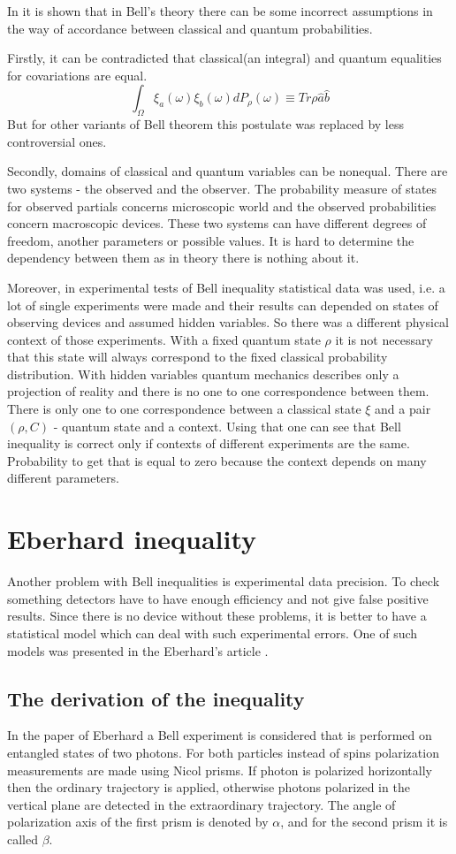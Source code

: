 \documentclass[11pt]{article}
\begin{document}
In \cite{Khrennikov_information} it is shown that in Bell's theory there can be some incorrect assumptions in the way of accordance between classical and quantum probabilities.

Firstly, it can be contradicted that classical(an integral) and quantum equalities for covariations are equal.
$$\int_\Omega\xi_a(\omega)\xi_b(\omega)dP_\rho(\omega) \equiv Tr\rho\hat{a}\hat{b}$$
But for other variants of Bell theorem this postulate was replaced by less controversial ones.

Secondly, domains of classical and quantum variables can be nonequal. There are two systems - the observed and the observer. The probability measure of states for observed partials concerns microscopic world and the observed probabilities concern macroscopic devices. These two systems can have different degrees of freedom, another parameters or possible values. It is hard to determine the dependency between them as in theory there is nothing about it.

Moreover, in experimental tests of Bell inequality statistical data was used, i.e. a lot of single experiments were made and their results can depended on states of observing devices and assumed hidden variables. So there was a different physical context of those experiments. With a fixed quantum state $\rho$ it is not necessary that this state will always correspond to the fixed classical probability distribution. With hidden variables quantum mechanics describes only a projection of reality and there is no one to one correspondence between them. There is only one to one correspondence between a classical state $\xi$ and a pair $(\rho, C)$ - quantum state and a context. Using that one can see that Bell inequality is correct only if contexts of different experiments are the same. Probability to get that is equal to zero because the context depends on many different parameters.

\section{Eberhard inequality}
Another problem with Bell inequalities is experimental data precision. To check something detectors have to have enough efficiency and not give false positive results. Since there is no device without these problems, it is better to have a statistical model which can deal with such experimental errors. One of such models was presented in the Eberhard's article \cite{Eberhard}.


\subsection{The derivation of the inequality}
In the paper of Eberhard \cite{Eberhard} a Bell experiment is considered that is performed on entangled states of two photons. For both particles instead of spins polarization measurements are made using Nicol prisms. If photon is polarized horizontally then the ordinary trajectory is applied, otherwise photons polarized in the vertical plane are detected in the extraordinary trajectory. The angle of polarization axis of the first prism is denoted by $\alpha$, and for the second prism it is called $\beta$.
\end{document}

